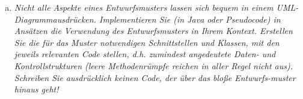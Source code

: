 \begin{enumerate}[(a)]
    \item {\itshape Nicht alle Aspekte eines Entwurfsmusters lassen sich bequem in einem UML-Diagrammausdrücken. Implementieren Sie (in Java oder Pseudocode) in Ansätzen die Verwendung des Entwurfsmusters in Ihrem Kontext. Erstellen Sie die für das Muster notwendigen Schnittstellen und Klassen, mit den jeweils relevanten Code stellen, d.h. zumindest angedeutete Daten- und Kontrollstrukturen (leere Methodenrümpfe reichen in aller Regel nicht aus). Schreiben Sie ausdrücklich keinen Code, der über das bloße Entwurfs-muster hinaus geht!}
    \\
    \begin{itemize}
    \newpage
    
    
    
    
    
    \newpage 
    
    
    

    \end{itemize}

\end{enumerate}
\newpage
